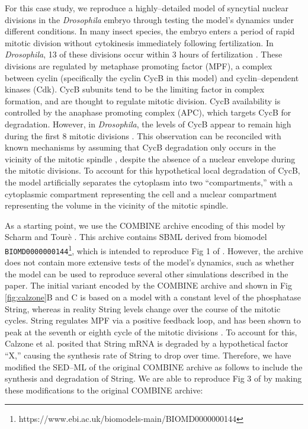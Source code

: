 \documentclass[10pt,letterpaper]{article}
\begin{document}
For this case study, we reproduce a highly--detailed model of syncytial nuclear divisions in the \textit{Drosophila} embryo \cite{calzone2007dynamical} through testing the model's dynamics under different conditions.
In many insect species, the embryo enters a period of rapid mitotic division without cytokinesis \cite{gilbertDevBiol} immediately following fertilization. In \textit{Drosophila}, 13 of these divisions occur within 3 hours of fertilization \cite{calzone2007dynamical}. These divisions are regulated by metaphase promoting factor (MPF), a complex between cyclin (specifically the cyclin CycB in this model) and cyclin--dependent kinases (Cdk). CycB subunits tend to be the limiting factor in complex formation, and are thought to regulate mitotic division. CycB availability is controlled by the anaphase promoting complex (APC), which targets CycB for degradation. However, in \textit{Drosophila}, the levels of CycB appear to remain high during the first 8 mitotic divisions \cite{edgar1994distinct}. This observation can be reconciled with known mechanisms by assuming that CycB degradation only occurs in the vicinity of the mitotic spindle \cite{calzone2007dynamical,huang2002dynamic,raff2002roles}, despite the absence of a nuclear envelope during the mitotic divisions. To account for this hypothetical local degradation of CycB, the model artificially separates the cytoplasm into two ``compartments,'' with a cytoplasmic compartment representing the cell and a nuclear compartment representing the volume in the vicinity of the mitotic spindle.%

As a starting point, we use the COMBINE archive encoding of this model by Scharm and Tour\`{e} \cite{scharmShowcase}. This archive contains SBML derived from biomodel \texttt{BIOMD0000000144}\footnote{https://www.ebi.ac.uk/biomodels-main/BIOMD0000000144}, which is intended to reproduce Fig 1 of \cite{calzone2007dynamical}. However, the archive does not contain more extensive tests of the model's dynamics, such as whether the model can be used to reproduce several other simulations described  in the paper. The initial variant encoded by the COMBINE archive and shown in Fig \ref{fig:calzone}B and C is based on a model with a constant level of the phosphatase String, whereas in reality String levels change over the course of the mitotic cycles. String regulates MPF via a positive feedback loop, and has been shown to peak at the seventh or eighth cycle of the mitotic divisions \cite{calzone2007dynamical}. To account for this, Calzone et al. \cite{calzone2007dynamical} posited that String mRNA is degraded by a hypothetical factor ``X,'' causing the synthesis rate of String to drop over time.
Therefore, we have modified the SED--ML of the original COMBINE archive \cite{scharmShowcase} as follows to include the synthesis and degradation of String. We are able to reproduce Fig 3 of \cite{calzone2007dynamical} by making these modifications to the original COMBINE archive:
\end{document}
